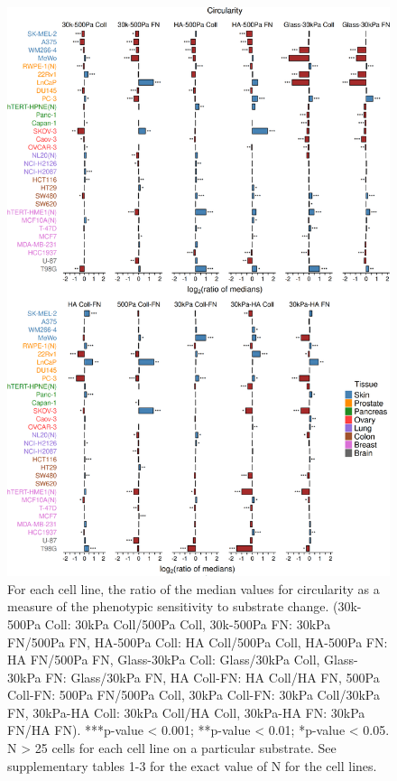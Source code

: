 \documentclass[11pt,letterpaper,english,oneside]{article} %
\begin{document}
\begin{figure}[H]
    \centering
    \includegraphics[scale=0.13]{../Figures/Supplementary_Figure3/supplementary_figure3.png}
    \caption{For each cell line, the ratio of the median values for circularity as a measure of the phenotypic sensitivity to substrate change. 
    (30k-500Pa Coll: 30kPa Coll/500Pa Coll, 30k-500Pa FN: 30kPa FN/500Pa FN, HA-500Pa Coll: HA Coll/500Pa Coll, HA-500Pa  FN: HA FN/500Pa FN, Glass-30kPa Coll: Glass/30kPa Coll, Glass-30kPa FN: Glass/30kPa FN, 
    HA Coll-FN: HA Coll/HA FN, 500Pa Coll-FN: 500Pa FN/500Pa Coll, 30kPa Coll-FN: 30kPa Coll/30kPa FN, 30kPa-HA Coll: 30kPa Coll/HA Coll, 30kPa-HA FN: 30kPa FN/HA FN). 
    ***p-value < 0.001; **p-value < 0.01; *p-value < 0.05. N > 25 cells for each cell line on a particular substrate. See supplementary tables 1-3 for the exact value of N for the cell lines.}
    \label{fig:fig3}
\end{figure}
\end{document}
